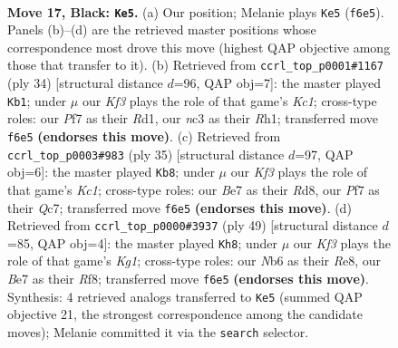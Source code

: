 \documentclass[11pt]{article}
\begin{document}
\clearpage

\begin{figure}[p]\centering
\begin{subfigure}{0.46\textwidth}\centering
\resizebox{\linewidth}{!}{%
\newchessgame
\chessboard[
  setfen={1rr5/ppp1bp2/1n1qbk1Q/8/P2pP3/2N3P1/1P3PB1/R1B1K2R b KQ - 2 17},
  showmover=false,
  pgfstyle=straightmove, color=movearrow, markmove={f6-e5}
]}
\caption{}
\end{subfigure}\hfill
\begin{subfigure}{0.46\textwidth}\centering
\resizebox{\linewidth}{!}{%
\newchessgame
\chessboard[
  setfen={r1b2rk1/pp3pp1/3b2n1/3p2q1/6p1/2NBP3/PPQB1P2/2KR3R w - - 0 18},
  showmover=false,
  pgfstyle=straightmove, color=movearrow, markmove={c1-b1}
]}
\caption{}
\end{subfigure}
\\[4pt]
\begin{subfigure}{0.46\textwidth}\centering
\resizebox{\linewidth}{!}{%
\newchessgame
\chessboard[
  setfen={2kr3r/ppqb1pp1/1b2pn1p/8/3N4/2P4P/PPB1QPP1/R1BR2K1 b - - 0 18},
  showmover=false,
  pgfstyle=straightmove, color=movearrow, markmove={c8-b8}
]}
\caption{}
\end{subfigure}\hfill
\begin{subfigure}{0.46\textwidth}\centering
\resizebox{\linewidth}{!}{%
\newchessgame
\chessboard[
  setfen={4rrk1/1pp3bp/p2p2p1/4q2n/2b1N3/2P1B2P/PPB2PP1/R2QR1K1 b - - 6 25},
  showmover=false,
  pgfstyle=straightmove, color=movearrow, markmove={g8-h8}
]}
\caption{}
\end{subfigure}
\caption{\textbf{Move 17, Black: \texttt{Ke5}.} (a) Our position; Melanie plays \texttt{Ke5} (\texttt{f6e5}). Panels (b)--(d) are the retrieved master positions whose correspondence most drove this move (highest QAP objective among those that transfer to it). (b) Retrieved from \texttt{ccrl\_top\_p0001\#1167} (ply 34) [structural distance $d$=96, QAP obj=7]: the master played \texttt{Kb1}; under $\mu$ our \emph{Kf3} plays the role of that game's \emph{Kc1}; cross-type roles: our \emph{P}f7 as their \emph{R}d1, our \emph{n}c3 as their \emph{R}h1; transferred move \texttt{f6e5} \textbf{(endorses this move)}. (c) Retrieved from \texttt{ccrl\_top\_p0003\#983} (ply 35) [structural distance $d$=97, QAP obj=6]: the master played \texttt{Kb8}; under $\mu$ our \emph{Kf3} plays the role of that game's \emph{Kc1}; cross-type roles: our \emph{B}e7 as their \emph{R}d8, our \emph{P}f7 as their \emph{Q}c7; transferred move \texttt{f6e5} \textbf{(endorses this move)}. (d) Retrieved from \texttt{ccrl\_top\_p0000\#3937} (ply 49) [structural distance $d$=85, QAP obj=4]: the master played \texttt{Kh8}; under $\mu$ our \emph{Kf3} plays the role of that game's \emph{Kg1}; cross-type roles: our \emph{N}b6 as their \emph{R}e8, our \emph{B}e7 as their \emph{R}f8; transferred move \texttt{f6e5} \textbf{(endorses this move)}. Synthesis: 4 retrieved analogs transferred to \texttt{Ke5} (summed QAP objective 21, the strongest correspondence among the candidate moves); Melanie committed it via the \texttt{search} selector.}
\label{fig:thought-m33}
\end{figure}
\end{document}
